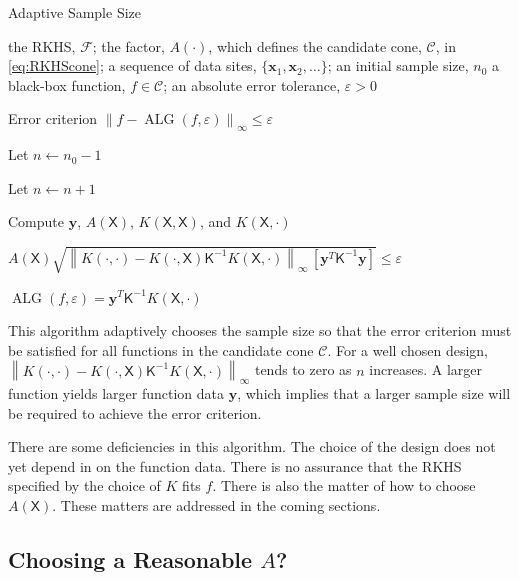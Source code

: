 \documentclass[]{mcom-l}
\theoremstyle{remark}
\DeclareMathOperator{\ALG}{ALG}
\newcommand{\mK}{\mathsf{K}}
\newcommand{\mX}{\mathsf{X}}
\newcommand{\bx}{{\boldsymbol{x}}}
\newcommand{\by}{{\boldsymbol{y}}}
\newcommand{\cc}{\mathcal{C}}
\newcommand{\calf}{{\mathcal{F}}}
\newcommand{\norm}[2][{}]{\ensuremath{\left \lVert #2 \right \rVert}_{#1}}
\begin{document}
\begin{algorithm}[H]
\caption{Adaptive Sample Size \label{alg:basicadapt}}
	\begin{algorithmic}
	\PARAM the RKHS, $\calf$; the factor, $A(\cdot)$, which defines  the candidate cone, $\cc$, in \eqref{eq:RKHScone};  a sequence of data sites, $\{\bx_1, \bx_2, \ldots \}$; an initial sample size, $n_0$
	\INPUT a black-box function, $f \in \cc$; an absolute error tolerance, $\varepsilon>0$

    \Ensure Error criterion $\norm[\infty]{f - \ALG(f,\varepsilon)} \le \varepsilon$

   \State Let $n \leftarrow n_0 -1$

\Repeat

\State Let $n \leftarrow n + 1$

\State Compute $\by$, $A(\mX)$, $K(\mX,\mX)$, and $K(\mX,\cdot)$

\Until $A(\mX) \sqrt{\norm[\infty]{K(\cdot,\cdot) - K(\cdot,\mX) \mK^{-1} K(\mX,\cdot)} \, [\by^T \mK^{-1} \by] }  \le \varepsilon$

\RETURN $\ALG(f,\varepsilon) = \by^T \mK^{-1} K(\mX,\cdot)$

\end{algorithmic}
\end{algorithm}

This algorithm adaptively chooses the sample size so that the error criterion must be satisfied for all functions in the candidate cone $\cc$.  For a well chosen design, $\norm[\infty]{K(\cdot,\cdot) - K(\cdot,\mX) \mK^{-1} K(\mX,\cdot)}$ tends to zero as $n$ increases.  A larger function yields larger function data $\by$, which implies that a larger sample size will be required to achieve the error criterion.

There are some deficiencies in this algorithm.  The choice of the design does not yet depend in on the function data.  There is no assurance that the RKHS specified by the choice of $K$ fits $f$.  There is also the matter of how to choose $A(\mX)$.  These matters are addressed in the coming sections.


\subsection{Choosing a Reasonable $A$?}
\end{document}
